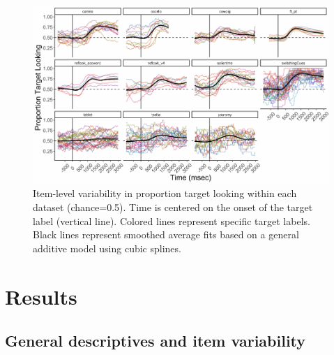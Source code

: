 \documentclass[10pt, letterpaper]{article}
\newenvironment{CodeChunk}{}{}
\begin{document}
\begin{CodeChunk}
\begin{figure}[h]

{\centering \includegraphics{figs/peekbank_item_vis-1} 

}

\caption[Item-level variability in proportion target looking within each dataset (chance=0.5)]{Item-level variability in proportion target looking within each dataset (chance=0.5). Time is centered on the onset of the target label (vertical line). Colored lines represent specific target labels. Black lines represent smoothed average fits based on a general additive model using cubic splines.}\label{fig:peekbank_item_vis}
\end{figure}
\end{CodeChunk}

\hypertarget{results}{%
\section{Results}\label{results}}

\hypertarget{general-descriptives-and-item-variability}{%
\subsection{General descriptives and item
variability}\label{general-descriptives-and-item-variability}}
\end{document}
